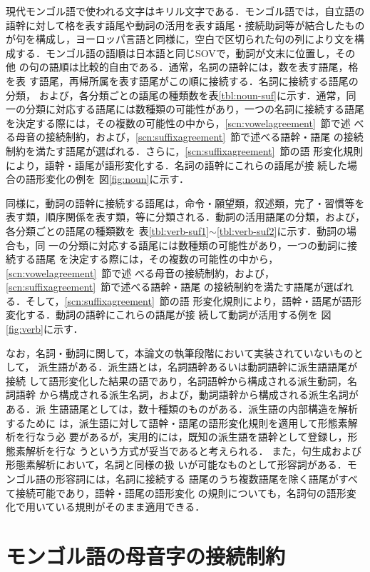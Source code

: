 現代モンゴル語で使われる文字はキリル文字である．モンゴル語では，自立語の
語幹に対して格を表す語尾や動詞の活用を表す語尾・接続助詞等が結合したもの
が句を構成し，ヨーロッパ言語と同様に，空白で区切られた句の列により文を構
成する．モンゴル語の語順は日本語と同じSOVで，動詞が文末に位置し，その他
の句の語順は比較的自由である．通常，名詞の語幹には，数を表す語尾，格を表
す語尾，再帰所属を表す語尾がこの順に接続する．名詞に接続する語尾の分類，
および，各分類ごとの語尾の種類数を表\ref{tbl:noun-suf}に示す．通常，同
一の分類に対応する語尾には数種類の可能性があり，一つの名詞に接続する語尾
を決定する際には，その複数の可能性の中から，\ref{scn:vowelagreement}~節で述
べる母音の接続制約，および，\ref{scn:suffixagreement}~節で述べる語幹・語尾
の接続制約を満たす語尾が選ばれる．さらに，\ref{scn:suffixagreement}~節の語
形変化規則により，語幹・語尾が語形変化する．名詞の語幹にこれらの語尾が接
続した場合の語形変化の例を
図\ref{fig:noun}に示す．

同様に，動詞の語幹に接続する語尾は，命令・願望類，叙述類，完了・習慣等を
表す類，順序関係を表す類，等に分類される．動詞の活用語尾の分類，および，
各分類ごとの語尾の種類数を
表\ref{tbl:verb-suf1}$\sim$\ref{tbl:verb-suf2}に示す．動詞の場合も，同
一の分類に対応する語尾には数種類の可能性があり，一つの動詞に接続する語尾
を決定する際には，その複数の可能性の中から，\ref{scn:vowelagreement}~節で述
べる母音の接続制約，および，\ref{scn:suffixagreement}~節で述べる語幹・語尾
の接続制約を満たす語尾が選ばれる．そして，\ref{scn:suffixagreement}~節の語
形変化規則により，語幹・語尾が語形変化する．動詞の語幹にこれらの語尾が接
続して動詞が活用する例を
図\ref{fig:verb}に示す．

なお，名詞・動詞に関して，本論文の執筆段階において実装されていないものと
して，
派生語がある．派生語とは，名詞語幹あるいは動詞語幹に派生語語尾が接続
して語形変化した結果の語であり，名詞語幹から構成される派生動詞，名詞語幹
から構成される派生名詞，および，動詞語幹から構成される派生名詞がある．派
生語語尾としては，数十種類のものがある．派生語の内部構造を解析するために
は，派生語に対して語幹・語尾の語形変化規則を適用して形態素解析を行なう必
要があるが，実用的には，既知の派生語を語幹として登録し，形態素解析を行な
うという方式が妥当であると考えられる．
また，句生成および形態素解析において，名詞と同様の扱
いが可能なものとして形容詞がある．モンゴル語の形容詞には，名詞に接続する
語尾のうち複数語尾を除く語尾がすべて接続可能であり，語幹・語尾の語形変化
の規則についても，名詞句の語形変化で用いている規則がそのまま適用できる．




\section{\label{scn:vowelagreement}モンゴル語の母音字の接続制約}

